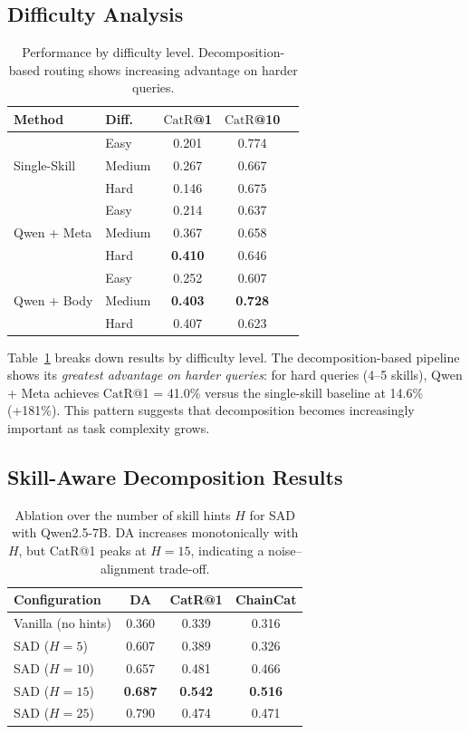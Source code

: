 \documentclass[11pt]{article}
\newcommand{\catrecall}{\text{CatR}}
\begin{document}
\subsection{Difficulty Analysis}

\begin{table}[t]
\centering
\small
\begin{tabular}{llccc}
\toprule
\textbf{Method} & \textbf{Diff.} & $\catrecall$\textbf{@1} & $\catrecall$\textbf{@10} \\
\midrule
\multirow{3}{*}{Single-Skill} & Easy & 0.201 & 0.774 \\
& Medium & 0.267 & 0.667 \\
& Hard & 0.146 & 0.675 \\
\midrule
\multirow{3}{*}{Qwen + Meta} & Easy & 0.214 & 0.637 \\
& Medium & 0.367 & 0.658 \\
& Hard & \textbf{0.410} & 0.646 \\
\midrule
\multirow{3}{*}{Qwen + Body} & Easy & 0.252 & 0.607 \\
& Medium & \textbf{0.403} & \textbf{0.728} \\
& Hard & 0.407 & 0.623 \\
\bottomrule
\end{tabular}
\caption{Performance by difficulty level. Decomposition-based routing shows increasing advantage on harder queries.}
\label{tab:difficulty}
\end{table}

Table~\ref{tab:difficulty} breaks down results by difficulty level.
The decomposition-based pipeline shows its \emph{greatest advantage on harder queries}: for hard queries (4--5 skills), Qwen + Meta achieves $\catrecall$@1 = 41.0\% versus the single-skill baseline at 14.6\% (+181\%).
This pattern suggests that decomposition becomes increasingly important as task complexity grows.

\subsection{Skill-Aware Decomposition Results}
\label{sec:sad-results}

\begin{table}[t]
\centering
\small
\begin{tabular}{lccc}
\toprule
\textbf{Configuration} & \textbf{DA} & \textbf{CatR@1} & \textbf{ChainCat} \\
\midrule
Vanilla (no hints) & 0.360 & 0.339 & 0.316 \\
\midrule
SAD ($H{=}5$) & 0.607 & 0.389 & 0.326 \\
SAD ($H{=}10$) & 0.657 & 0.481 & 0.466 \\
SAD ($H{=}15$) & \textbf{0.687} & \textbf{0.542} & \textbf{0.516} \\
SAD ($H{=}25$) & 0.790 & 0.474 & 0.471 \\
\bottomrule
\end{tabular}
\caption{Ablation over the number of skill hints $H$ for SAD with Qwen2.5-7B. DA increases monotonically with $H$, but CatR@1 peaks at $H{=}15$, indicating a noise--alignment trade-off.}
\label{tab:sad-ablation}
\end{table}
\end{document}
